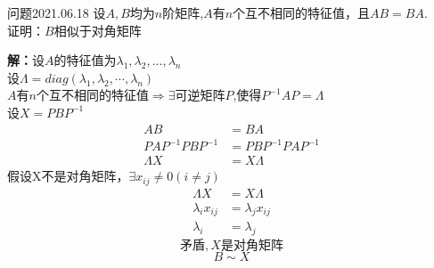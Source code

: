 \begin{mybox}{问题2021.06.18}
	\qquad 设$A,B$均为$n$阶矩阵,$A$有$n$个互不相同的特征值，且$AB=BA$.\\
	证明：$B$相似于对角矩阵
\end{mybox}	
\noindent 
\textbf{解：}设$A$的特征值为$\lambda_{1},\lambda_{2},...,\lambda_{n}$\\
设$\Lambda=diag(\lambda_{1},\lambda_{2},\cdots,\lambda_{n})$\\
$A$有$n$个互不相同的特征值$\Rightarrow \exists$可逆矩阵$P$,使得$P^{-1}AP=\Lambda$\\
设$X=PBP^{-1}$
\begin{align*}
AB&=BA\\
PAP^{-1}PBP^{-1}&=PBP^{-1}PAP^{-1}\\
\Lambda X&=X\Lambda	
\end{align*}
假设X不是对角矩阵，$\exists x_{ij}\neq 0(i\neq j)$
\begin{align*}
	\Lambda X&=X\Lambda	\\
	\lambda_{i}x_{ij}&=\lambda_{j}x_{ij}\\
	\lambda_{i}&=\lambda_{j}
\end{align*}
$$\text{矛盾},X\text{是对角矩阵}$$
$$B\sim X$$
